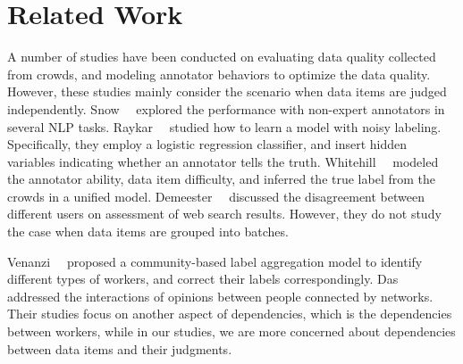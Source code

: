 \section{Related Work}
\label{sec:related}

A number of studies have been conducted on evaluating data quality collected from crowds, and modeling annotator behaviors to optimize the data quality.  
However, these studies mainly consider the scenario when data items are judged independently.  
Snow~\etal~\cite{snow:emnlp2008} explored the performance with non-expert annotators in several NLP tasks.
Raykar~\etal~\cite{raykar:nips2011ranking,raykar:icml2009,raykar:jmlr2010}
studied how to learn a model with noisy labeling. Specifically, they employ a logistic regression classifier, and insert hidden
variables indicating whether an annotator tells the truth. %
Whitehill~\etal~\cite{whitehill:nips2009} modeled the annotator ability, data item difficulty, and inferred the true label from the crowds in a unified model.
Demeester~\etal~\cite{demeester:wsdm2014} discussed the disagreement between different users on assessment of web search results.
However, they do not study the case when data items are grouped into batches.

Venanzi~\etal~\cite{venanzi:www2014} proposed a community-based label aggregation model to identify different types of workers, 
and correct their labels correspondingly.  
Das~\etal~\cite{das:kdd2013} addressed the interactions of opinions between people connected by networks.
Their studies focus on another aspect of dependencies, 
which is the dependencies between workers, 
while in our studies, we are more concerned about dependencies between data items and their judgments.  



